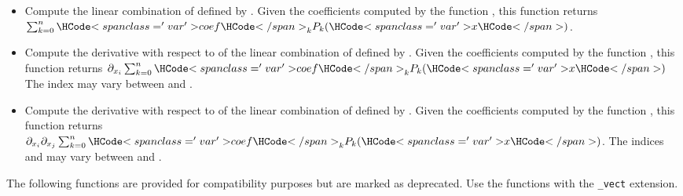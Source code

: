 \begin{itemize}
\item {}
  \sshortdescribe Compute the linear combination of  defined by
  . Given the coefficients computed by the function
  , this function returns $\sum_{k=0}^n
  \var{coef}_k  P_k(\var{x})$.

\item {}
  \sshortdescribe Compute the derivative with respect to  of the
  linear combination of  defined by . Given the
  coefficients computed by the function , this function
  returns $\partial_{x_i} \sum_{k=0}^n \var{coef}_k  P_k(\var{x})$ The index
   may vary between  and .


\item {}
  \sshortdescribe Compute the derivative with respect to  of the
  linear combination of  defined by . Given the
  coefficients computed by the function , this function
  returns $\partial_{x_i} \partial_{x_j} \sum_{k=0}^n \var{coef}_k
  P_k(\var{x})$.  The indices  and  may vary between  and
  .

\end{itemize}
The following functions are provided for compatibility purposes but are marked as
deprecated. Use the functions with the \verb!_vect! extension.
